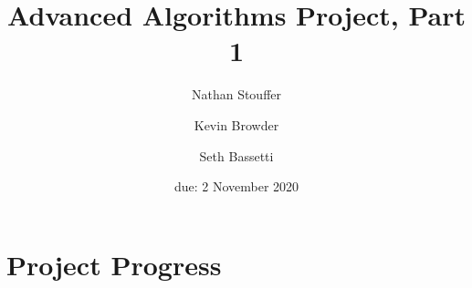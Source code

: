 \documentclass{article}
\title{Advanced Algorithms Project, Part 1}
\author{Nathan Stouffer \and Kevin Browder \and Seth Bassetti}
\date{due: 2 November 2020}
\begin{document}
\maketitle

\section{Project Progress}
\end{document}

